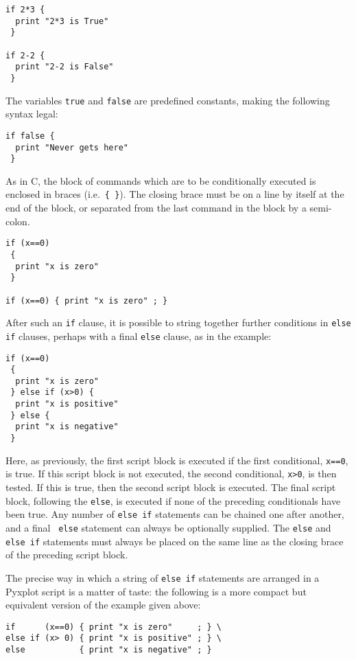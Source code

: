 \begin{verbatim}
if 2*3 {
  print "2*3 is True"
 }

if 2-2 {
  print "2-2 is False"
 }
\end{verbatim}

\noindent The variables {\tt true} and {\tt false} are predefined constants, making the following syntax legal:

\begin{verbatim}
if false {
  print "Never gets here"
 }
\end{verbatim}

As in C, the block of commands which are to be conditionally executed is
enclosed in braces (i.e.\ {\tt \{~\}}).  The closing brace must be on a line by
itself at the end of the block, or separated from the last command in the block
by a semi-colon.

\begin{verbatim}
if (x==0)
 {
  print "x is zero"
 }

if (x==0) { print "x is zero" ; }
\end{verbatim}

After such an {\tt if} clause, it is possible to string together further
conditions in {\tt else if} clauses, perhaps with a final {\tt else} clause, as
in the example:

\begin{verbatim}
if (x==0)
 {
  print "x is zero"
 } else if (x>0) {
  print "x is positive"
 } else {
  print "x is negative"
 }
\end{verbatim}

Here, as previously, the first script block is executed if the first
conditional, {\tt x==0}, is true. If this script block is not executed, the
second conditional, {\tt x>0}, is then tested. If this is true, then the second
script block is executed.  The final script block, following the {\tt else}, is
executed if none of the preceding conditionals have been true. Any number of
{\tt else if} statements can be chained one after another, and a final {\tt
else} statement can always be optionally supplied. The {\tt else} and {\tt else
if} statements must always be placed on the same line as the closing brace of
the preceding script block.

The precise way in which a string of {\tt else if} statements are arranged in a
Pyxplot script is a matter of taste: the following is a more compact but
equivalent version of the example given above:

\begin{verbatim}
if      (x==0) { print "x is zero"     ; } \
else if (x> 0) { print "x is positive" ; } \
else           { print "x is negative" ; }
\end{verbatim}

